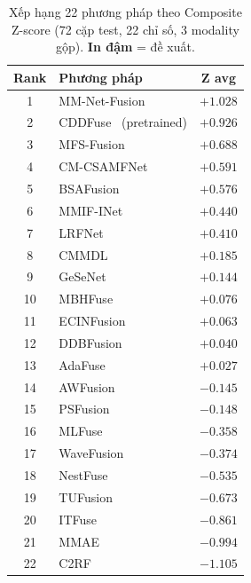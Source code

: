 \documentclass[12pt,a4paper]{article}
\begin{document}
\begin{table}[h]
\centering
\caption{Xếp hạng 22 phương pháp theo Composite Z-score (72 cặp test, 22 chỉ
số, 3 modality gộp). \textbf{In đậm} = đề xuất.}
\label{tab:sota-zscore}
\small
\setlength{\tabcolsep}{5pt}
\begin{tabular}{clc}
\toprule
\textbf{Rank} & \textbf{Phương pháp} & \textbf{Z avg} \\
\midrule
1  & MM-Net-Fusion~\cite{liu2024mmnet}              & $+1.028$ \\
2  & CDDFuse~\cite{zhao2023cddfuse} (pretrained)    & $+0.926$ \\
3  & MFS-Fusion~\cite{chen2025mfsfusion}            & $+0.688$ \\
4  & CM-CSAMFNet                                    & $+0.591$ \\
5  & BSAFusion                                      & $+0.576$ \\
6  & MMIF-INet~\cite{he2025mmifiNet}                & $+0.440$ \\
7  & LRFNet                                         & $+0.410$ \\
8  & CMMDL                                          & $+0.185$ \\
9  & GeSeNet~\cite{li2023gesenet}                   & $+0.144$ \\
10 & MBHFuse~\cite{sun2025mbhfuse}                  & $+0.076$ \\
11 & ECINFusion~\cite{wei2025ecinfusion}             & $+0.063$ \\
12 & DDBFusion~\cite{zhang2025ddbfusion}             & $+0.040$ \\
13 & AdaFuse                                         & $+0.027$ \\
14 & AWFusion~\cite{xu2025awfusion}                  & $-0.145$ \\
15 & PSFusion~\cite{tang2023psfusion}                & $-0.148$ \\
16 & MLFuse                                          & $-0.358$ \\
17 & WaveFusion~\cite{wang2025wavefusion}            & $-0.374$ \\
18 & NestFuse~\cite{li2020nestfuse}                  & $-0.535$ \\
19 & TUFusion~\cite{zhao2024tufusion}                & $-0.673$ \\
20 & ITFuse~\cite{tang2024itfuse}                    & $-0.861$ \\
21 & MMAE~\cite{wang2025mmae}                        & $-0.994$ \\
22 & C2RF~\cite{yan2025c2rf}                         & $-1.105$ \\
\bottomrule
\end{tabular}
\end{table}
\end{document}
